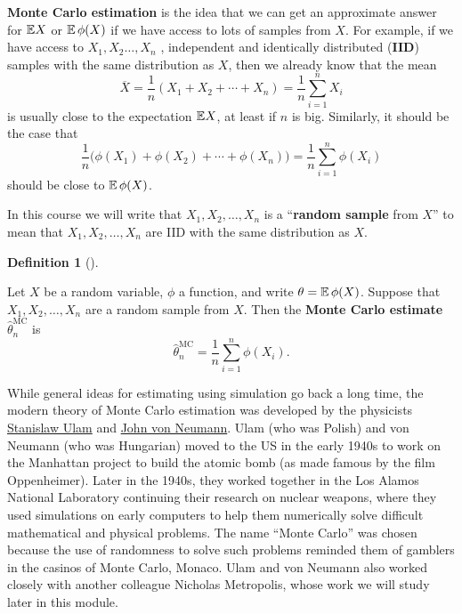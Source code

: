 \documentclass[
  letterpaper,
  DIV=11,
  numbers=noendperiod]{scrreprt}
\theoremstyle{definition}
\theoremstyle{definition}
\newtheorem{definition}{Definition}[chapter]
\theoremstyle{remark}
\begin{document}
\textbf{Monte Carlo estimation} is the idea that we can get an
approximate answer for \(\mathbb{E} X\) or \(\operatorname{\mathbb{E}} \phi(X)\) if we have access
to lots of samples from \(X\). For example, if we have access to
\(X_1, X_2 \dots, X_n\) , independent and identically distributed
(\textbf{IID}) samples with the same distribution as \(X\), then we
already know that the mean
\[ \overline X = \frac{1}{n}(X_1 + X_2 + \cdots + X_n) = \frac{1}{n} \sum_{i=1}^n X_i \]
is usually close to the expectation \(\mathbb{E} X\), at least if \(n\) is big.
Similarly, it should be the case that
\[ \frac{1}{n} \big(\phi(X_1) + \phi(X_2) + \cdots + \phi(X_n) \big) = \frac{1}{n} \sum_{i=1}^n \phi(X_i) \]
should be close to \(\operatorname{\mathbb{E}} \phi(X)\).

In this course we will write that \(X_1, X_2, \dots, X_n\) is a
``\textbf{random sample} from \(X\)'' to mean that
\(X_1, X_2, \dots, X_n\) are IID with the same distribution as \(X\).

\begin{definition}[]\protect\hypertarget{def-MCest}{}\label{def-MCest}

Let \(X\) be a random variable, \(\phi\) a function, and write
\(\theta = \operatorname{\mathbb{E}}\phi(X)\). Suppose that \(X_1, X_2, \dots, X_n\) are a
random sample from \(X\). Then the \textbf{Monte Carlo estimate}
\(\widehat\theta_n^{\mathrm{MC}}\) is
\[ \widehat{\theta}_n^{\mathrm{MC}} = \frac{1}{n} \sum_{i=1}^n \phi(X_i) . \]

\end{definition}

While general ideas for estimating using simulation go back a long time,
the modern theory of Monte Carlo estimation was developed by the
physicists \href{https://en.wikipedia.org/wiki/Stanisław_Ulam}{Stanislaw
Ulam} and \href{John\%20von\%20Neumann}{John von Neumann}. Ulam (who was
Polish) and von Neumann (who was Hungarian) moved to the US in the early
1940s to work on the Manhattan project to build the atomic bomb (as made
famous by the film Oppenheimer). Later in the 1940s, they worked
together in the Los Alamos National Laboratory continuing their research
on nuclear weapons, where they used simulations on early computers to
help them numerically solve difficult mathematical and physical
problems. The name ``Monte Carlo'' was chosen because the use of
randomness to solve such problems reminded them of gamblers in the
casinos of Monte Carlo, Monaco. Ulam and von Neumann also worked closely
with another colleague Nicholas Metropolis, whose work we will study
later in this module.
\end{document}
